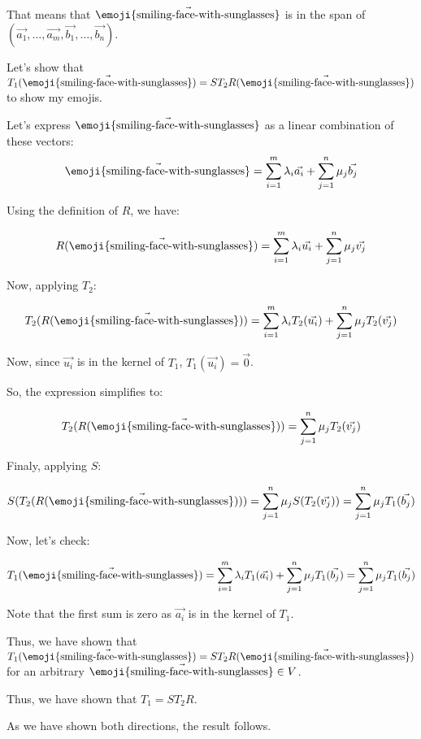 \documentclass{report}
\newcommand{\memoji}[1]{\ifmmode \text{\emoji{#1}} \else \emoji{#1} \fi}
\begin{document}
{{		That means that \(\vec{\memoji{smiling-face-with-sunglasses}}\) is in the span of \((\vec{a_1}, \ldots, \vec{a_m}, \vec{b_1}, \ldots, \vec{b_n})\).

		Let's show that \(T_1(\vec{\memoji{smiling-face-with-sunglasses}}) = ST_2R(\vec{\memoji{smiling-face-with-sunglasses}})\) to show my emojis.

		Let's express \(\vec{\memoji{smiling-face-with-sunglasses}}\) as a linear combination of these vectors:
		\[
			\vec{\memoji{smiling-face-with-sunglasses}} = \sum_{i=1}^{m} \lambda_i \vec{a_i} + \sum_{j=1}^{n} \mu_j \vec{b_j}
		\]

		Using the definition of \(R\), we have:


		\[
			R(\vec{\memoji{smiling-face-with-sunglasses}}) = \sum_{i=1}^{m} \lambda_i \vec{u_i} + \sum_{j=1}^{n} \mu_j \vec{v_j}
		\]
		
		Now, applying \(T_2\):

		\[
			T_2(R(\vec{\memoji{smiling-face-with-sunglasses}})) = \sum_{i=1}^{m} \lambda_i T_2(\vec{u_i}) + \sum_{j=1}^{n} \mu_j T_2(\vec{v_j})
		\] 

		Now, since \(\vec{u_i}\) is in the kernel of \(T_1\), \(T_1(\vec{u_i}) = \vec{0}\). 

		So, the expression simplifies to:

		\[
			T_2(R(\vec{\memoji{smiling-face-with-sunglasses}})) = \sum_{j=1}^{n} \mu_j T_2(\vec{v_j})
		\] 

		Finaly, applying \(S\):

		\[
			S(T_2(R(\vec{\memoji{smiling-face-with-sunglasses}}))) = \sum_{j=1}^{n} \mu_j S(T_2(\vec{v_j})) = \sum_{j=1}^{n} \mu_j T_1(\vec{b_j})
		\]

		Now, let's check:

		\[
		T_1(\vec{\memoji{smiling-face-with-sunglasses}}) = \sum_{i=1}^{m} \lambda_i T_1(\vec{a_i}) + \sum_{j=1}^{n} \mu_j T_1(\vec{b_j}) = \sum_{j=1}^{n} \mu_j T_1(\vec{b_j})
		\] 

		Note that the first sum is zero as \(\vec{a_i}\) is in the kernel of \(T_1\).

		Thus, we have shown that \(T_1(\vec{\memoji{smiling-face-with-sunglasses}}) = ST_2R(\vec{\memoji{smiling-face-with-sunglasses}})\) for an arbitrary \(\vec{\memoji{smiling-face-with-sunglasses}} \in V\).

		Thus, we have shown that \(T_1 = ST_2R\).

	}

	\parinf
	As we have shown both directions, the result follows.

}
\end{document}
